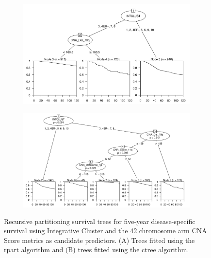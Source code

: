 \begin{figure}[!h]
\centering

\vspace{0.5cm}

\begin{subfigure}{\textwidth}
\subcaption{}
\includegraphics[width=1\textwidth]{../figures/Chapter_3/PA_PartyKit_Survival_Score_TenYearDSS_INTCLUST.png}
\end{subfigure}

\vspace{2cm}

\begin{subfigure}{\textwidth}
\subcaption{}
\includegraphics[width=1\textwidth]{../figures/Chapter_3/PA_Ctree_Survival_Score_TenYearDSS_INTCLUST.png}
\end{subfigure}

\vspace{0.5cm}

\caption[Recursive partitioning survival trees for five-year disease-specific survival using Integrative Cluster and the 42 chromosome arm CNA Score metrics as candidate predictors.]{Recursive partitioning survival trees for five-year disease-specific survival using  Integrative Cluster and the 42 chromosome arm CNA Score metrics as candidate predictors. (A) Trees fitted using the rpart algorithm and (B) trees fitted using the ctree algorithm.}
\label{fig:INTCLUST_PA_CNA_Score_TenYearDSS}
\end{figure}


